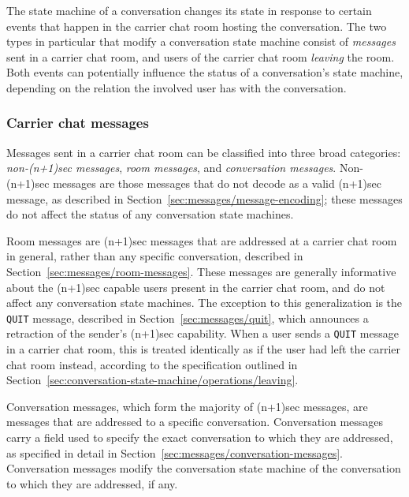 \documentclass{article}
\def\npmessage#1{\texttt{#1}}
\begin{document}
The state machine of a conversation changes its state in response to certain events that happen in the carrier chat room hosting the conversation.
The two types in particular that modify a conversation state machine consist of \emph{messages} sent in a carrier chat room, and users of the carrier chat room \emph{leaving} the room.
Both events can potentially influence the status of a conversation's state machine, depending on the relation the involved user has with the conversation.


\subsubsection{Carrier chat messages}
\label{sec:conversation-state-machine/operations/messages}

Messages sent in a carrier chat room can be classified into three broad categories: \emph{non-(n+1)sec messages}, \emph{room messages}, and \emph{conversation messages}.
Non-(n+1)sec messages are those messages that do not decode as a valid (n+1)sec message, as described in Section~\ref{sec:messages/message-encoding}; these messages do not affect the status of any conversation state machines.

Room messages are (n+1)sec messages that are addressed at a carrier chat room in general, rather than any specific conversation, described in Section~\ref{sec:messages/room-messages}.
These messages are generally informative about the (n+1)sec capable users present in the carrier chat room, and do not affect any conversation state machines.
The exception to this generalization is the \npmessage{QUIT} message, described in Section~\ref{sec:messages/quit}, which announces a retraction of the sender's (n+1)sec capability.
When a user sends a \npmessage{QUIT} message in a carrier chat room, this is treated identically as if the user had left the carrier chat room instead, according to the specification outlined in Section~\ref{sec:conversation-state-machine/operations/leaving}.

Conversation messages, which form the majority of (n+1)sec messages, are messages that are addressed to a specific conversation.
Conversation messages carry a field used to specify the exact conversation to which they are addressed, as specified in detail in Section~\ref{sec:messages/conversation-messages}.
Conversation messages modify the conversation state machine of the conversation to which they are addressed, if any.
\end{document}
